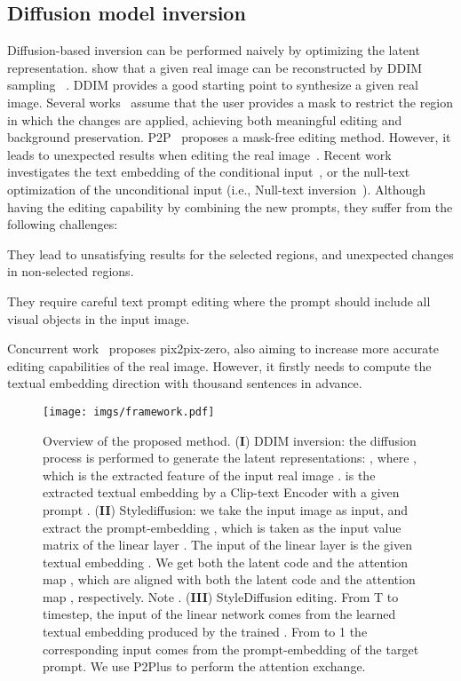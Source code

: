 \documentclass[twocolumn]{svjour3}          \smartqed  \usepackage{graphicx}
\begin{document}
\subsection{Diffusion model inversion}
Diffusion-based inversion can be performed naively by optimizing the latent representation.  \cite{dhariwal2021diffusion} show that a given real image can be reconstructed by DDIM sampling ~\citep{song2020denoising}. DDIM provides a good starting point to synthesize a given real image.  Several works~\citep{avrahami2022blendedlatent, avrahami2022blended,nichol2021glide} assume that the user provides a mask to restrict the region in which the changes are applied, achieving both meaningful editing and background preservation. P2P~\citep{hertz2022prompt} proposes a mask-free editing method. However, it leads to unexpected results when editing the real image~\citep{mokady2022null}.  Recent work investigates the text embedding of the conditional input~\citep{gal2022image},  or the null-text optimization of the unconditional input (i.e., Null-text inversion~\citep{ mokady2022null}).  Although having the editing capability by combining the new prompts,  
they suffer from the following challenges:
   \begin{enumerate*}[label=(\Roman*)]
    \item They lead to unsatisfying results for the selected regions, and unexpected changes in non-selected regions.    
    \item They require careful text prompt editing where the prompt should include all visual objects in the input image.    
 \end{enumerate*}

Concurrent work~\citep{parmar2023zero} proposes pix2pix-zero, also aiming to increase more accurate editing capabilities of the real image. However, it firstly needs to compute the textual embedding direction with thousand sentences in advance. 


 
\begin{figure*}[t]
\centering
\texttt{[image: imgs/framework.pdf]}
        \caption{Overview of the proposed method. (\textbf{I}) DDIM inversion: the diffusion process is performed to generate the latent representations: , where , which is the extracted feature of the input real image .  is the extracted textual embedding by a Clip-text Encoder with a given prompt .    (\textbf{II}) Stylediffusion: we take the input image  as input, and extract the prompt-embedding , which is taken as the input value matrix  of the linear layer . The input of  the linear layer  is the given textual embedding .  We get both the latent code  and the attention map , which are aligned with both the latent code  and the attention map , respectively.  Note  .     (\textbf{III}) StyleDiffusion editing. From T to  timestep, the input of the linear network  comes from the learned textual embedding  produced by the trained . From  to 1 the corresponding input comes from the prompt-embedding  of the target prompt. We use P2Plus to perform the attention exchange.}
    \label{fig:framework}
\end{figure*}
\end{document}
